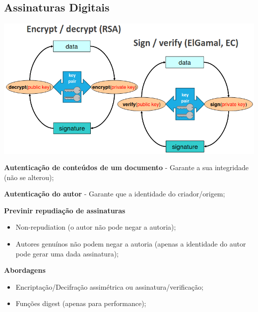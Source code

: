 \documentclass{article}
\begin{document}
\subsection{Assinaturas Digitais}

\begin{center}
  \includegraphics[scale=0.4]{10}
\end{center}

\pagebreak

\begin{flushleft}
  \textbf{Autenticação de conteúdos de um documento} - Garante a sua integridade
  (não se alterou);

  \vspace{2mm}

  \textbf{Autenticação do autor} - Garante que a identidade do criador/origem;

  \vspace{2mm}

  \textbf{Previnir repudiação de assinaturas}
  \begin{itemize}
    \item Non-repudiation (o autor não pode negar a autoria);
    \item Autores genuínos não podem negar a autoria (apenas a identidade
    do autor pode gerar uma dada assinatura);
  \end{itemize}

  \vspace{2mm}

  \textbf{Abordagens}
  \begin{itemize}
    \item Encriptação/Decifração assimétrica ou assinatura/verificação;
    \item Funções digest (apenas para performance);
  \end{itemize}
\end{flushleft}
\end{document}
